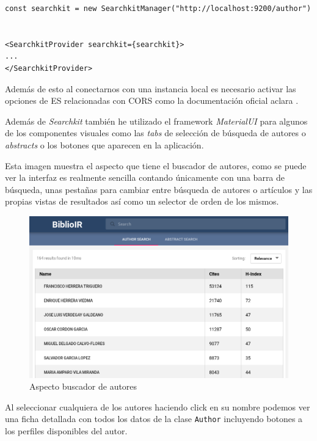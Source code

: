 \newpage

\begin{lstlisting}[style=htmlcssjs, caption=Conexión de \textit{Searchkit} a una instancia \acrshort{ES} local]
const searchkit = new SearchkitManager("http://localhost:9200/author")


<SearchkitProvider searchkit={searchkit}>
...
</SearchkitProvider>
\end{lstlisting}

Además de esto al conectarnos con una instancia local es necesario activar las opciones de \acrshort{ES} relacionadas con CORS como la documentación oficial aclara \cite{searchKit_cors}.

Además de \textit{Searchkit} también he utilizado el \gls{framework} \textit{MaterialUI} para algunos de los componentes visuales como las \textit{tabs} de selección de búsqueda de autores o \textit{abstracts} o los botones que aparecen en la aplicación.

Esta imagen muestra el aspecto que tiene el buscador de autores, como se puede ver la interfaz es realmente sencilla contando únicamente con una barra de búsqueda, unas pestañas para cambiar entre búsqueda de autores o artículos y las propias vistas de resultados así como un selector de orden de los mismos.


\begin{figure}[h]
	
	\centering
	\includegraphics[width=\linewidth]{imagenes/AspectoBuscadorAutores}
	\caption{Aspecto buscador de autores}
\end{figure}
\newpage
Al seleccionar cualquiera de los autores haciendo click en su nombre podemos ver una ficha detallada con todos los datos de la clase \texttt{Author} incluyendo botones a los perfiles disponibles del autor.

